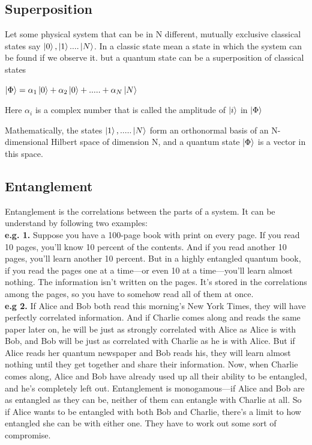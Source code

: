 \documentclass[11 pt]{article}
\theoremstyle{definition}
\theoremstyle{remark}
\begin{document}
\subsection{Superposition}
Let some physical system that can be in N different, mutually exclusive classical states say $\ket{0},\ket{1} .... \ket{N}$. In a classic state mean a state in which the system
can be found if we observe it. but a quantum state can be a superposition
of classical states
\begin{center}
$\ket{\Phi} = \alpha_1\ket{0} + \alpha_2\ket{0}+ ..... +\alpha_N\ket{N} $
\end{center}
Here $\alpha_i$ is a complex number that is called the amplitude of $\ket{i}$ in $\ket{\Phi}$

Mathematically, the states $\ket{1}, ..... \ket{N}$ form an orthonormal basis of an N-dimensional Hilbert space of dimension N, and a
quantum state $\ket{\Phi}$ is a vector in this space.


\subsection{Entanglement}
Entanglement is the correlations between the parts of a system. It can be understand by following two examples:\\
\textbf{e.g. 1.} Suppose you have a 100-page book with print on every page. If you read 10 pages, you'll know 10 percent of the contents. And if you read another 10 pages, you'll learn another 10 percent. But in a highly entangled quantum book, if you read the pages one at a time—or even 10 at a time—you'll learn almost nothing. The information isn't written on the pages. It's stored in the correlations among the pages, so you have to somehow read all of them at once.\\
\textbf{e.g 2.} If Alice and Bob both read this morning's New York Times, they will have perfectly correlated information. And if Charlie comes along and reads the same paper later on, he will be just as strongly correlated with Alice as Alice is with Bob, and Bob will be just as correlated with Charlie as he is with Alice. But if Alice reads her quantum newspaper and Bob reads his, they will learn almost nothing until they get together and share their information. Now, when Charlie comes along, Alice and Bob have already used up all their ability to be entangled, and he's completely left out. Entanglement is monogamous—if Alice and Bob are as entangled as they can be, neither of them can entangle with Charlie at all. So if Alice wants to be entangled with both Bob and Charlie, there's a limit to how entangled she can be with either one. They have to work out some sort of compromise.
\end{document}

